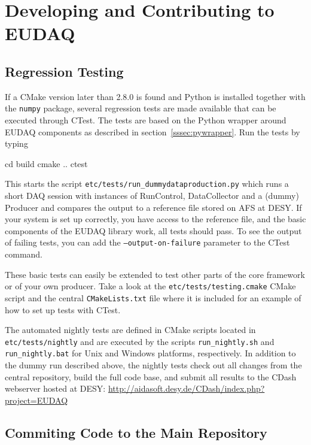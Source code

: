 \section{Developing and Contributing to EUDAQ}

\subsection{Regression Testing}
\label{sec:ctest}

If a CMake version later than 2.8.0 is found and Python is installed
together with the \texttt{numpy} package, several regression tests are made
available that can be executed through CTest. The tests are based on
the Python wrapper around EUDAQ components as described in
section~\ref{sssec:pywrapper}. Run the tests by typing

\begin{listing}[mybash]
  cd build
  cmake ..
  ctest
\end{listing}

This starts the script \texttt{etc/tests/run\_dummydataproduction.py}
which runs a short DAQ session with instances of RunControl,
DataCollector and a (dummy) Producer and compares the output to a
reference file stored on AFS at DESY. If your system is set up
correctly, you have access to the reference file, and the basic
components of the EUDAQ library work, all tests should pass.
To see the output of failing tests, you can add the
\texttt{--output-on-failure} parameter to the CTest command.

These basic tests can easily be extended to test other parts of the
core framework or of your own producer. Take a look at the
\texttt{etc/tests/testing.cmake} CMake script and the central
\texttt{CMakeLists.txt} file where it is included for an example of
how to set up tests with CTest.

The automated nightly tests are defined in CMake scripts located in
\texttt{etc/tests/nightly} and are executed by the scripts
\texttt{run\_nightly.sh} and \texttt{run\_nightly.bat} for Unix and
Windows platforms, respectively. In addition to the dummy run
described above, the nightly tests check out all changes from the
central repository, build the full code base, and submit all results
to the CDash webserver hosted at DESY: \url{http://aidasoft.desy.de/CDash/index.php?project=EUDAQ}

\subsection{Commiting Code to the Main Repository}
\label{sec:commiting}

